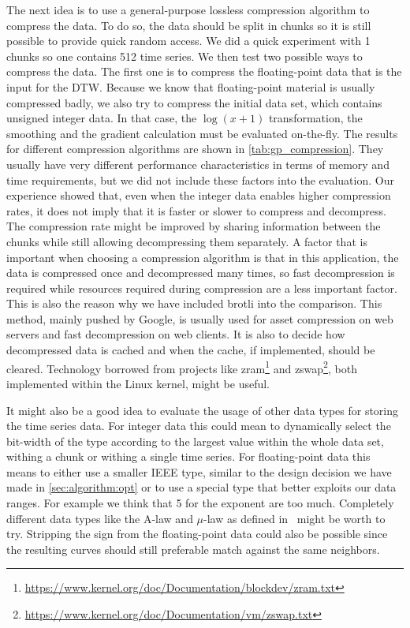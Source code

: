 The next idea is to use a general-purpose lossless compression algorithm to compress the data. To do so, the data should be split in chunks so it is still possible to provide quick random access. We did a quick experiment with \SI{1}{\mega\byte} chunks so one contains \num{512} time series. We then test two possible ways to compress the data. The first one is to compress the floating-point data that is the input for the DTW\@. Because we know that floating-point material is usually compressed badly, we also try to compress the initial data set, which contains unsigned integer data. In that case, the $\log(x + 1)$ transformation, the smoothing and the gradient calculation must be evaluated on-the-fly. The results for different compression algorithms are shown in \autoref{tab:gp_compression}. They usually have very different performance characteristics in terms of memory and time requirements, but we did not include these factors into the evaluation. Our experience showed that, even when the integer data enables higher compression rates, it does not imply that it is faster or slower to compress and decompress. The compression rate might be improved by sharing information between the chunks while still allowing decompressing them separately. A factor that is important when choosing a compression algorithm is that in this application, the data is compressed once and decompressed many times, so fast decompression is required while resources required during compression are a less important factor. This is also the reason why we have included brotli into the comparison. This method, mainly pushed by Google, is usually used for asset compression on web servers and fast decompression on web clients. It is also to decide how decompressed data is cached and when the cache, if implemented, should be cleared. Technology borrowed from projects like zram\footnote{\url{https://www.kernel.org/doc/Documentation/blockdev/zram.txt}} and zswap\footnote{\url{https://www.kernel.org/doc/Documentation/vm/zswap.txt}}, both implemented within the Linux kernel, might be useful.

It might also be a good idea to evaluate the usage of other data types for storing the time series data. For integer data this could mean to dynamically select the bit-width of the type according to the largest value within the whole data set, withing a chunk or withing a single time series. For floating-point data this means to either use a smaller IEEE type, similar to the design decision we have made in \autoref{sec:algorithm:opt} or to use a special type that better exploits our data ranges. For example we think that \SI{5}{\bit} for the exponent are too much. Completely different data types like the A-law and $\mu$-law as defined in~\cite{G711} might be worth to try. Stripping the sign from the floating-point data could also be possible since the resulting curves should still preferable match against the same neighbors.

